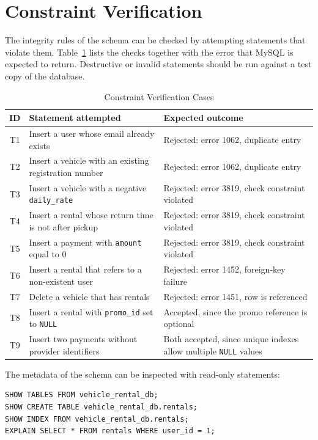 \documentclass[10pt,a4paper]{report}
\newcommand{\col}[1]{\texttt{#1}}
\begin{document}
\section{Constraint Verification}
The integrity rules of the schema can be checked by attempting statements that violate them. Table~\ref{tab:tests} lists the checks together with the error that MySQL is expected to return. Destructive or invalid statements should be run against a test copy of the database.

\begin{table}[htbp]
\centering
\small
\caption{Constraint Verification Cases}
\label{tab:tests}
\begin{tabular}{@{}c>{\raggedright\arraybackslash}p{5.2cm}>{\raggedright\arraybackslash}p{5.8cm}@{}}
\toprule
\textbf{ID} & \textbf{Statement attempted} & \textbf{Expected outcome} \\
\midrule
T1 & Insert a user whose email already exists & Rejected: error 1062, duplicate entry \\
T2 & Insert a vehicle with an existing registration number & Rejected: error 1062, duplicate entry \\
T3 & Insert a vehicle with a negative \col{daily_rate} & Rejected: error 3819, check constraint violated \\
T4 & Insert a rental whose return time is not after pickup & Rejected: error 3819, check constraint violated \\
T5 & Insert a payment with \col{amount} equal to 0 & Rejected: error 3819, check constraint violated \\
T6 & Insert a rental that refers to a non-existent user & Rejected: error 1452, foreign-key failure \\
T7 & Delete a vehicle that has rentals & Rejected: error 1451, row is referenced \\
T8 & Insert a rental with \col{promo_id} set to \col{NULL} & Accepted, since the promo reference is optional \\
T9 & Insert two payments without provider identifiers & Both accepted, since unique indexes allow multiple \col{NULL} values \\
\bottomrule
\end{tabular}
\end{table}

The metadata of the schema can be inspected with read-only statements:

\begin{lstlisting}[caption={Inspecting tables and indexes},label={lst:inspect}]
SHOW TABLES FROM vehicle_rental_db;
SHOW CREATE TABLE vehicle_rental_db.rentals;
SHOW INDEX FROM vehicle_rental_db.rentals;
EXPLAIN SELECT * FROM rentals WHERE user_id = 1;
\end{lstlisting}
\end{document}
